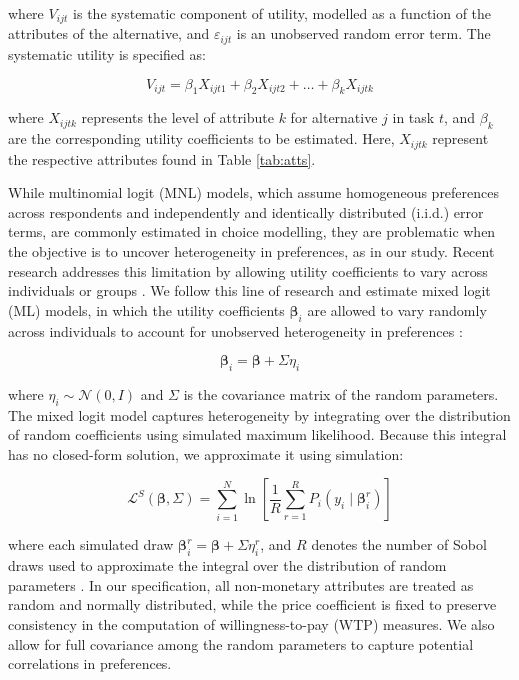 \documentclass[3p,11pt ]{elsarticle}
\begin{document}
\noindent where \( V_{ijt} \) is the systematic component of utility, modelled as a function of the attributes of the alternative, and \( \varepsilon_{ijt} \) is an unobserved random error term.
The systematic utility is specified as:

\begin{equation}
V_{ijt} = \beta_1 X_{ijt1} + \beta_2 X_{ijt2} + \ldots + \beta_k X_{ijtk}
\end{equation}

\noindent where \( X_{ijtk} \) represents the level of attribute \( k \) for alternative \( j \) in task \( t \), and \( \beta_k \) are the corresponding utility coefficients to be estimated.
Here,
\( X_{ijtk} \) represent the respective attributes found in Table \ref{tab:atts}.

While multinomial logit (MNL) models,
which assume homogeneous preferences across respondents and independently and identically distributed (i.i.d.) error terms,
are commonly estimated in choice modelling,
they are problematic when the objective is to uncover heterogeneity in preferences, as in our study. 
Recent research addresses this limitation by allowing utility coefficients to vary across individuals or groups \citep{aitkenOlderHomebuyersPrefer2024, zhaoUsingConjointAnalysis2023, caplanMeasuringHeterogeneousPreferences2021}. 
We follow this line of research and estimate mixed logit (ML) models, in which the utility coefficients \( \boldsymbol{\beta}_i \) are allowed to vary randomly across individuals to account for unobserved heterogeneity in preferences \citep{mcfaddenMixedMNLModels2000}:


\begin{equation}
\boldsymbol{\beta}_i = \boldsymbol{\beta} + \Sigma \eta_i
\end{equation}

\noindent where \( \eta_i \sim \mathcal{N}(0, I) \) and \( \Sigma \) is the covariance matrix of the random parameters. 
The mixed logit model captures heterogeneity by integrating over the distribution of random coefficients using simulated maximum likelihood. 
Because this integral has no closed-form solution, we approximate it using simulation:

\begin{equation}
\mathcal{L}^S(\boldsymbol{\beta}, \Sigma) = \sum_{i=1}^{N} 
\ln \left[ \frac{1}{R} \sum_{r=1}^{R} 
P_i(y_i \mid \boldsymbol{\beta}_i^{r}) \right]
\end{equation}

\noindent where each simulated draw \( \boldsymbol{\beta}_i^{r} = \boldsymbol{\beta} + \Sigma \eta_i^{r} \), and \( R \) denotes the number of Sobol draws used to approximate the integral over the distribution of random parameters \citep{trainDiscreteChoiceMethods2003}. 
In our specification, all non-monetary attributes are treated as random and normally distributed, while the price coefficient is fixed to preserve consistency in the computation of willingness-to-pay (WTP) measures. 
We also allow for full covariance among the random parameters to capture potential correlations in preferences.
\end{document}

